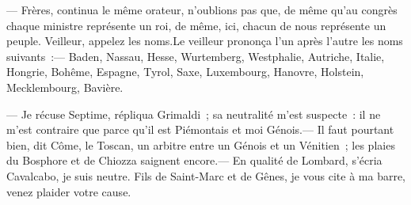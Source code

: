 \documentclass[11pt,twoside,openany]{book}
\newenvironment{lateiDocument}{}{}
\begin{document}
\begin{lateiDocument}
\begin{teiElement}[name={TEI},change={commons\_edition}]
\begin{teiElement}[name={text},type={book},xmlid={book}]
\begin{teiElement}[name={group},type={book},xmlid={book-001}]
\begin{teiElement}[name={group},type={section1},xmlid={section1-001}]
\begin{teiElement}
\begin{teiElement}[name={body},xmlid={body-003}]
\begin{teiDiv}[type={section1},xmlid={div02-2}]
              \begin{teiCit}[xmlid={cit06-2}]

                \begin{teiQuote}
— Frères, continua le même orateur, n’oublions pas que, de même qu’au congrès chaque ministre représente un roi, de même, ici, chacun de nous représente un peuple. Veilleur, appelez les noms.\teiLb{}Le veilleur prononça l’un après l’autre les noms suivants :\teiLb{}— Baden, Nassau, Hesse, Wurtemberg, Westphalie, Autriche, Italie, Hongrie, Bohême, Espagne, Tyrol, Saxe, Luxembourg, Hanovre, Holstein, Mecklembourg, Bavière.
\end{teiQuote}
              
\end{teiCit}
              \begin{teiCit}[xmlid={cit07}]

                \begin{teiQuote}
— Je récuse Septime, répliqua Grimaldi ; sa neutralité m’est suspecte : il ne m’est contraire que parce qu’il est Piémontais et moi Génois.\teiLb{}— Il faut pourtant bien, dit Côme, le Toscan, un arbitre entre un Génois et un Vénitien ; les plaies du Bosphore et de Chiozza saignent encore.\teiLb{}— En qualité de Lombard, s’écria Cavalcabo, je suis neutre. Fils de Saint-Marc et de Gênes, je vous cite à ma barre, venez plaider votre cause.
\end{teiQuote}
              

\end{teiCit}
\end{teiDiv}
\end{teiElement}
\end{teiElement}
\end{teiElement}
\end{teiElement}
\end{teiElement}
\end{teiElement}
\end{lateiDocument}
\end{document}
